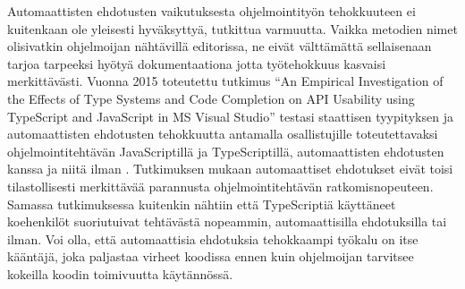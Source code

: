 Automaattisten ehdotusten vaikutuksesta ohjelmointityön tehokkuuteen ei
kuitenkaan ole yleisesti hyväksyttyä, tutkittua varmuutta. Vaikka metodien
nimet olisivatkin ohjelmoijan nähtävillä editorissa, ne eivät välttämättä
sellaisenaan tarjoa tarpeeksi hyötyä dokumentaationa jotta työtehokkuus
kasvaisi merkittävästi. Vuonna 2015 toteutettu tutkimus
``An Empirical Investigation of the Effects of Type Systems and Code Completion
on API Usability using TypeScript and JavaScript in MS Visual Studio''
testasi staattisen tyypityksen ja automaattisten ehdotusten tehokkuutta
antamalla osallistujille toteutettavaksi ohjelmointitehtävän JavaScriptillä
ja TypeScriptillä, automaattisten ehdotusten kanssa ja niitä ilman
\cite{EmpiricalInvestigationOfCodeCompletion}. Tutkimuksen mukaan
automaattiset ehdotukset eivät toisi tilastollisesti merkittävää parannusta
ohjelmointitehtävän ratkomisnopeuteen. Samassa tutkimuksessa kuitenkin nähtiin
että TypeScriptiä käyttäneet koehenkilöt suoriutuivat tehtävästä nopeammin,
automaattisilla ehdotuksilla tai ilman. Voi olla, että automaattisia ehdotuksia
tehokkaampi työkalu on itse kääntäjä, joka paljastaa virheet koodissa ennen
kuin ohjelmoijan tarvitsee kokeilla koodin toimivuutta käytännössä.
